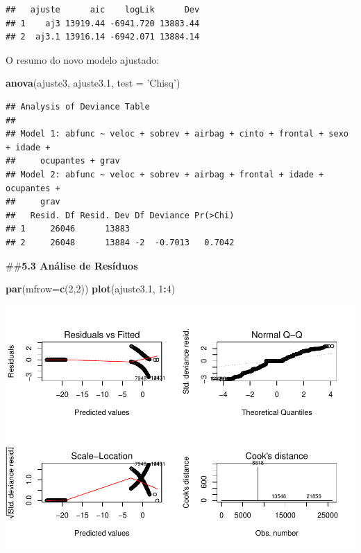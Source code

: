 \documentclass[]{article}
\newenvironment{Shaded}{\begin{snugshade}}{\end{snugshade}}
\newcommand{\KeywordTok}[1]{\textcolor[rgb]{0.13,0.29,0.53}{\textbf{#1}}}
\newcommand{\DataTypeTok}[1]{\textcolor[rgb]{0.13,0.29,0.53}{#1}}
\newcommand{\DecValTok}[1]{\textcolor[rgb]{0.00,0.00,0.81}{#1}}
\newcommand{\FloatTok}[1]{\textcolor[rgb]{0.00,0.00,0.81}{#1}}
\newcommand{\StringTok}[1]{\textcolor[rgb]{0.31,0.60,0.02}{#1}}
\newcommand{\OperatorTok}[1]{\textcolor[rgb]{0.81,0.36,0.00}{\textbf{#1}}}
\newcommand{\NormalTok}[1]{#1}
\begin{document}
\begin{verbatim}
##   ajuste      aic    logLik      Dev
## 1    aj3 13919.44 -6941.720 13883.44
## 2  aj3.1 13916.14 -6942.071 13884.14
\end{verbatim}

O resumo do novo modelo ajustado:

\begin{Shaded}
\begin{Highlighting}[]
\KeywordTok{anova}\NormalTok{(ajuste3, ajuste3}\FloatTok{.1}\NormalTok{, }\DataTypeTok{test =} \StringTok{'Chisq'}\NormalTok{)}
\end{Highlighting}
\end{Shaded}

\begin{verbatim}
## Analysis of Deviance Table
## 
## Model 1: abfunc ~ veloc + sobrev + airbag + cinto + frontal + sexo + idade + 
##     ocupantes + grav
## Model 2: abfunc ~ veloc + sobrev + airbag + frontal + idade + ocupantes + 
##     grav
##   Resid. Df Resid. Dev Df Deviance Pr(>Chi)
## 1     26046      13883                     
## 2     26048      13884 -2  -0.7013   0.7042
\end{verbatim}

\#\#\textbf{5.3 Análise de Resíduos}

\begin{Shaded}
\begin{Highlighting}[]
\KeywordTok{par}\NormalTok{(}\DataTypeTok{mfrow=}\KeywordTok{c}\NormalTok{(}\DecValTok{2}\NormalTok{,}\DecValTok{2}\NormalTok{))}
\KeywordTok{plot}\NormalTok{(ajuste3}\FloatTok{.1}\NormalTok{, }\DecValTok{1}\OperatorTok{:}\DecValTok{4}\NormalTok{)}
\end{Highlighting}
\end{Shaded}

\includegraphics{Dados_Binários1_files/figure-latex/unnamed-chunk-16-1.pdf}
\end{document}
